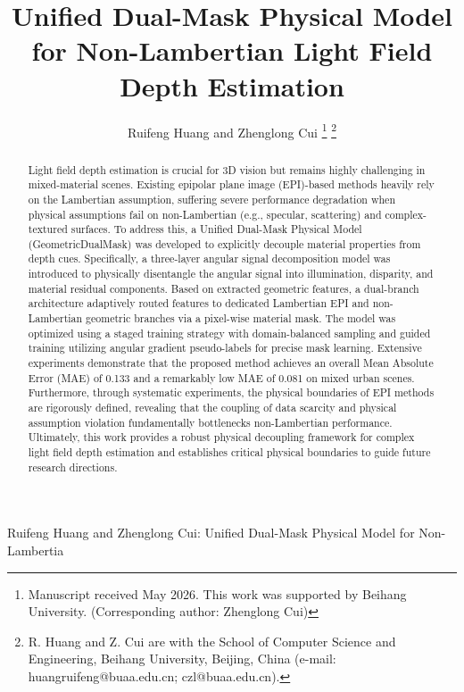 \documentclass[lettersize,journal]{IEEEtran}
\begin{document}
\title{Unified Dual-Mask Physical Model for Non-Lambertian Light Field Depth Estimation}

\author{Ruifeng Huang and Zhenglong Cui
\thanks{Manuscript received May 2026. This work was supported by Beihang University. (Corresponding author: Zhenglong Cui)}
\thanks{R. Huang and Z. Cui are with the School of Computer Science and Engineering, Beihang University, Beijing, China (e-mail: huangruifeng@buaa.edu.cn; czl@buaa.edu.cn).}}

%
{Ruifeng Huang and Zhenglong Cui: Unified Dual-Mask Physical Model for Non-Lambertia}

\maketitle

\begin{abstract}
Light field depth estimation is crucial for 3D vision but remains highly challenging in mixed-material scenes. Existing epipolar plane image (EPI)-based methods heavily rely on the Lambertian assumption, suffering severe performance degradation when physical assumptions fail on non-Lambertian (e.g., specular, scattering) and complex-textured surfaces. To address this, a Unified Dual-Mask Physical Model (GeometricDualMask) was developed to explicitly decouple material properties from depth cues. Specifically, a three-layer angular signal decomposition model was introduced to physically disentangle the angular signal into illumination, disparity, and material residual components. Based on extracted geometric features, a dual-branch architecture adaptively routed features to dedicated Lambertian EPI and non-Lambertian geometric branches via a pixel-wise material mask. The model was optimized using a staged training strategy with domain-balanced sampling and guided training utilizing angular gradient pseudo-labels for precise mask learning. Extensive experiments demonstrate that the proposed method achieves an overall Mean Absolute Error (MAE) of 0.133 and a remarkably low MAE of 0.081 on mixed urban scenes. Furthermore, through systematic experiments, the physical boundaries of EPI methods are rigorously defined, revealing that the coupling of data scarcity and physical assumption violation fundamentally bottlenecks non-Lambertian performance. Ultimately, this work provides a robust physical decoupling framework for complex light field depth estimation and establishes critical physical boundaries to guide future research directions.
\end{abstract}
\end{document}
